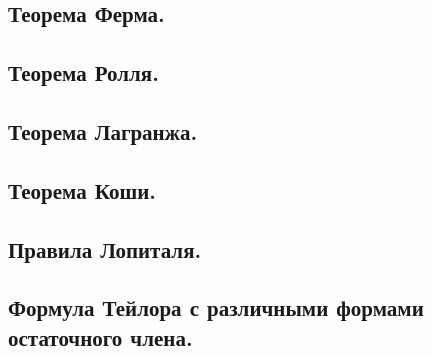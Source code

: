 \documentclass[a4paper,12pt]{article}
\theoremstyle{plain} %
\theoremstyle{definition} %
\theoremstyle{remark} %
\begin{document}
\begin{center}
\subsection*{Теорема Ферма.                                                                             }
\end{center}


\begin{center}
\subsection*{Теорема Ролля.                                                                             }
\end{center}

\begin{center}
\subsection*{Теорема Лагранжа.                                                                          }
\end{center}

\begin{center}
\subsection*{Теорема Коши.                                                                              }
\end{center}

\begin{center}
\subsection*{Правила Лопиталя.                                                                          }
\end{center}

\begin{center}
\subsection*{Формула Тейлора с различными формами остаточного члена.                                   }
\end{center}
\end{document}
